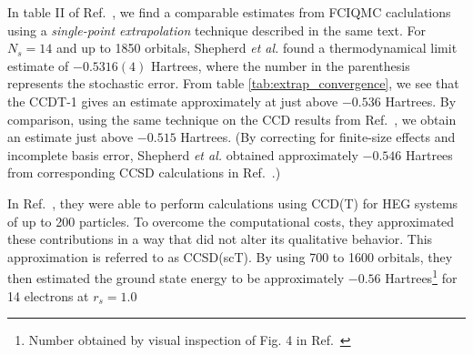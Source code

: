 In table II of Ref.~\cite{Shepherd2012}, we find a comparable estimates from FCIQMC caclulations using a \emph{single-point extrapolation} technique described in the same text. For $N_s=14$ and up to 1850 orbitals, Shepherd \emph{et al.} found a thermodynamical limit estimate of $-0.5316(4)$ Hartrees, where the number in the parenthesis represents the stochastic error. From table \ref{tab:extrap_convergence}, we see that the CCDT-1 gives an estimate approximately at just above $-0.536$ Hartrees. By comparison, using the same technique on the CCD results from Ref.~\cite{Baardsen2015}, we obtain an estimate just above $-0.515$ Hartrees. (By correcting for finite-size effects and incomplete basis error, Shepherd \emph{et al.} obtained approximately $-0.546$ Hartrees from corresponding CCSD calculations in Ref.~\cite{Shepherd2013}.)

In Ref.~\cite{Shepherd2013}, they were able to perform calculations using CCD(T) for HEG systems of up to 200 particles. To overcome the computational costs, they approximated these contributions in a way that did not alter its qualitative behavior.  This approximation is referred to as CCSD(scT). By using 700 to 1600 orbitals, they then estimated the ground state energy to be approximately $-0.56$ Hartrees\footnote{Number obtained by visual inspection of Fig. 4 in Ref.~\cite{Shepherd2013}} for 14 electrons at $r_s = 1.0$


